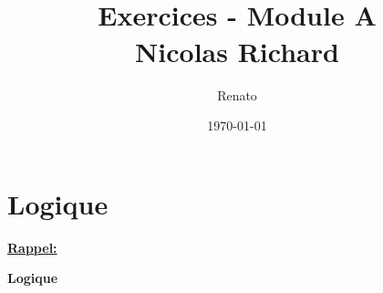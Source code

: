 \documentclass{report}
\title{\Large{\bsc{MATH-F-112 - Math\'{e}matiques}}\\
  Exercices - Module A\\
  Nicolas Richard
  }
\author{Renato \bsc{Costa Ribeiro}}
\date{\today}
\begin{document}
\maketitle
\tableofcontents

\newpage
\Huge{}


\chapter{Logique}
\begin{flushleft} \begin{large}\textbf{\underline{Rappel:}}\end{large}\end{flushleft}

\begin{flushleft} \begin{large}\textbf{Logique}\end{large}\end{flushleft}
\end{document}
